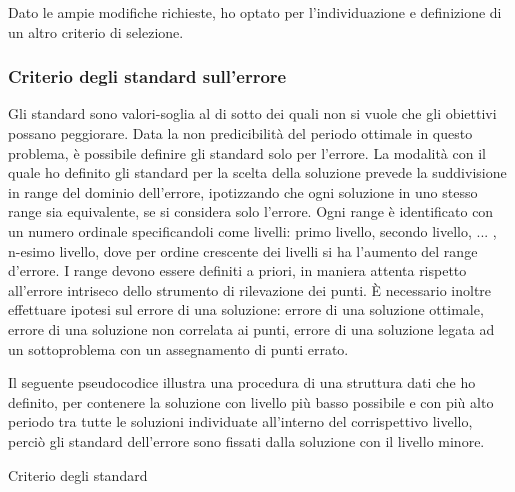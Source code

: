 \documentclass[a4paper,12pt]{report}
\begin{document}
Dato le ampie modifiche richieste, ho optato per l'individuazione e definizione di un altro criterio di selezione.

\subsubsection{Criterio degli standard sull'errore}
Gli standard sono valori-soglia al di sotto dei quali non si vuole che gli
obiettivi possano peggiorare. Data la non predicibilità del periodo ottimale in questo problema, è possibile definire gli standard solo per l'errore. La modalità con il quale ho definito gli standard per la scelta della soluzione prevede la suddivisione in range del dominio dell'errore, ipotizzando che ogni soluzione in uno stesso range sia equivalente, se si considera solo l'errore. Ogni range è identificato con un numero ordinale specificandoli come livelli: primo livello, secondo livello, ... , n-esimo livello, dove per ordine crescente dei livelli si ha l'aumento del range d'errore. I range devono essere definiti a priori, in maniera attenta rispetto all'errore intriseco dello strumento di rilevazione dei punti. È necessario inoltre effettuare ipotesi sul errore di una soluzione: errore di una soluzione ottimale, errore di una soluzione non correlata ai punti, errore di una soluzione legata ad un sottoproblema con un assegnamento di punti errato.

Il seguente pseudocodice illustra una procedura di una struttura dati che ho definito, per contenere la soluzione con livello più basso possibile e con più alto periodo tra tutte le soluzioni individuate all'interno del corrispettivo livello, perciò gli standard dell'errore sono fissati dalla soluzione con il livello minore.
\begin{algorithm}
\caption{Criterio degli standard}\label{alg: standard}
\eIf{\LivelloDi{\SolCorrente} $<$ \LivelloDi{\SolOttimale}}{ \label{std:min}
    $\SolOttimale \gets \SolCorrente$\\
}{\If{\LivelloDi{\SolCorrente} $=$ \LivelloDi{\SolOttimale}}{
      \eIf{\LivelloDi{\SolCorrente} $=$ \UltimoLv } {
          \If{$\SolCorrente[errore] < \SolOttimale[errore]$}{ \label{std:last}
              $\SolOttimale \gets \SolCorrente$\\
          }
       } {
          \If{$\SolCorrente[periodo] < \SolOttimale[periodo]$}{ \label{std:per}
              $\SolOttimale \gets \SolCorrente$\\
          }
       }
  }
}
\end{algorithm}
\end{document}
